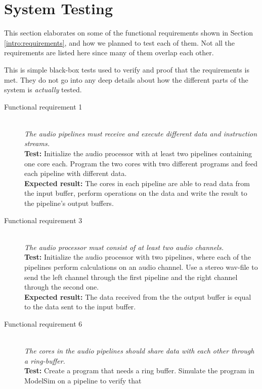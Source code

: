 \section{System Testing}

This section elaborates on some of the functional requirements shown in Section
\ref{intro:requirements}, and how we planned to test each of them. Not all the
requirements are listed here since many of them overlap each other.

This is simple black-box tests used to verify and proof that the requirements is
met. They do not go into any deep details about how the different parts of the
system is \textit{actually} tested.

\begin{description}
    \item[Functional requirement 1] \hfill \\
        \textit{The audio pipelines must receive and execute different data and instruction streams.} \\
        \textbf{Test:} Initialize the audio processor with at least two pipelines
        containing one core each. Program the two cores with two different programs and feed
        each pipeline with different data.\\
        \textbf{Expected result:} The cores in each pipeline are able to read data from the input buffer,
        perform operations on the data and write the result to the pipeline's output buffers.
    \item[Functional requirement 3] \hfill \\
        \textit{The audio processor must consist of at least two audio channels.} \\
        \textbf{Test:} Initialize the audio processor with two pipelines, where each of the
        pipelines perform calculations on an audio channel. Use a stereo wav-file to send
        the left channel through the first pipeline and the right channel through the
        second one. \\
        \textbf{Expected result:} The data received from the the output buffer is equal to the
        data sent to the input buffer.
    \item[Functional requirement 6] \hfill \\
        \textit{The cores in the audio pipelines should share data with each other through a ring-buffer.} \\
        \textbf{Test:} Create a program that needs a ring buffer.
        Simulate the program in ModelSim on a pipeline to verify that

\end{description}

